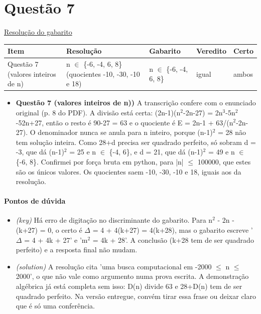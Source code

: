 \documentclass{article}%
\begin{document}
\section*{Questão 7}%
\href{https://poliedroresolve.sistemapoliedro.com.br/vestibulares/ita/2027/ita-2-fase-dia-1-20-10-2026-2-fase-dia-1/dissertativa-7-matematica-2-fase-dia-1-ita-2027}{Resolução do gabarito}\par\smallskip%
\begin{longtable}{@{}p{} p{} p{} p{} p{}@{}}\toprule Item & Resolução & Gabarito & Veredito & Certo \\ \midrule
Questão 7 (valores inteiros de n) & n $\in$ \{-6, -4, 6, 8\} (quocientes -10, -30, -10 e 18) & n $\in$ \{-6, -4, 6, 8\} & igual & ambos \\
\bottomrule\end{longtable}%
\begin{itemize}%
\item%
\textbf{Questão 7 (valores inteiros de n))} A transcrição confere com o enunciado original (p. 8 do PDF). A divisão está certa: (2n-1)(n$^2$-2n-27) = 2n$^3$-5n$^2$-52n+27, então o resto é 90-27 = 63 e o quociente é E = 2n-1 + 63/(n$^2$-2n-27). O denominador nunca se anula para n inteiro, porque (n-1)$^2$ = 28 não tem solução inteira. Como 28+d precisa ser quadrado perfeito, só sobram d = -3, que dá (n-1)$^2$ = 25 e n $\in$ \{-4, 6\}, e d = 21, que dá (n-1)$^2$ = 49 e n $\in$ \{-6, 8\}. Confirmei por força bruta em python, para |n| $\leq$ 100000, que estes são os únicos valores. Os quocientes saem -10, -30, -10 e 18, iguais aos da resolução.%
\end{itemize}%
\paragraph{Pontos de dúvida}%
\begin{itemize}%
\item%
\textit{(key)} Há erro de digitação no discriminante do gabarito. Para n$^2$ - 2n - (k+27) = 0, o certo é $\Delta$ = 4 + 4(k+27) = 4(k+28), mas o gabarito escreve '$\Delta$ = 4 + 4k + 27' e 'm$^2$ = 4k + 28'. A conclusão (k+28 tem de ser quadrado perfeito) e a resposta final não mudam.%
\item%
\textit{(solution)} A resolução cita 'uma busca computacional em -2000 $\leq$ n $\leq$ 2000', o que não vale como argumento numa prova escrita. A demonstração algébrica já está completa sem isso: D(n) divide 63 e 28+D(n) tem de ser quadrado perfeito. Na versão entregue, convém tirar essa frase ou deixar claro que é só uma conferência.%
\end{itemize}%
\end{document}

